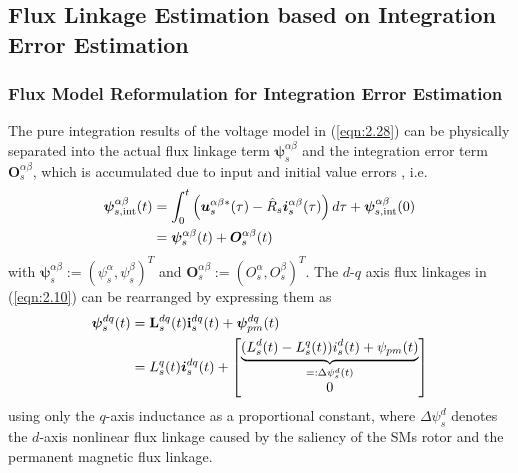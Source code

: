 \subsection{Flux Linkage Estimation based on Integration Error Estimation}
\subsubsection{Flux Model Reformulation for Integration Error Estimation}
The pure integration results of the voltage model in (\ref{eqn:2.28}) can be physically separated into the actual flux linkage term $\boldsymbol{\psi}^{\alpha\beta}_s$ and the integration error term $\boldsymbol{O}^{\alpha\beta}_s$, which is accumulated due to input and initial value errors \cite{c3.2_1}, i.e.
\begin{align}\notag
\bm{\psi}^{\alpha\beta}_{s,\text{int}}(t) &= \int_{0}^{t} \left( \bm{u}^{\alpha\beta*}_{s}(\tau) - \hat R_s \bm{i}^{\alpha\beta}_s(\tau) \right) d\tau + \bm{\psi}^{\alpha\beta}_{s,\text{int}}(0)
\\\label{eqn:3.4}
&= \boldsymbol{\psi}^{\alpha\beta}_s(t) + \boldsymbol{O}^{\alpha\beta}_s(t) 
\end{align}
with $\boldsymbol{\psi}^{\alpha\beta}_s := (\psi^{\alpha}_s, \psi^{\beta}_s)^T$ and $\boldsymbol{O}^{\alpha\beta}_s := (O^{\alpha}_s, O^{\beta}_s)^T$. The $d$-$q$ axis flux linkages in (\ref{eqn:2.10}) can be rearranged by expressing them as
\begin{align}\notag
\boldsymbol\psi^{dq}_s(t) 
&= 
\mathbf{L}^{dq}_s(t)
\mathbf{i}^{dq}_s(t)
+
\boldsymbol{\psi}^{dq}_{pm}(t) \\
&= 
L^q_s(t)\boldsymbol{i}^{dq}_s(t)
+
\begin{bmatrix}
    \underbrace{(L^d_s(t) - L^q_s(t))i^d_s(t) + \psi_{pm}(t)}_{=:\Delta\psi^d_s(t)} \\
    0
\end{bmatrix}\label{eqn:3.5}
\end{align}
using only the $q$-axis inductance as a proportional constant, where $\Delta\psi^d_s$ denotes the $d$-axis nonlinear flux linkage caused by the saliency of the SMs rotor and the permanent magnetic flux linkage. 

